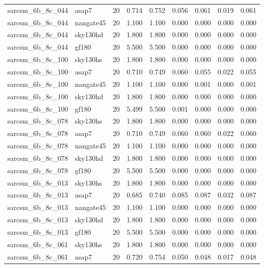 \begin{tabular}{llrrrrrrr}
sarcsm\_6b\_8c\_044 & asap7 & 20 & 0.714 & 0.752 & 0.056 & 0.061 & 0.019 & 0.061 \\
sarcsm\_6b\_8c\_044 & nangate45 & 20 & 1.100 & 1.100 & 0.000 & 0.000 & 0.000 & 0.000 \\
sarcsm\_6b\_8c\_044 & sky130hd & 20 & 1.800 & 1.800 & 0.000 & 0.000 & 0.000 & 0.000 \\
sarcsm\_6b\_8c\_044 & gf180 & 20 & 5.500 & 5.500 & 0.000 & 0.000 & 0.000 & 0.000 \\
sarcsm\_6b\_8c\_100 & sky130hs & 20 & 1.800 & 1.800 & 0.000 & 0.000 & 0.000 & 0.000 \\
sarcsm\_6b\_8c\_100 & asap7 & 20 & 0.710 & 0.749 & 0.060 & 0.055 & 0.022 & 0.055 \\
sarcsm\_6b\_8c\_100 & nangate45 & 20 & 1.100 & 1.100 & 0.000 & 0.001 & 0.000 & 0.001 \\
sarcsm\_6b\_8c\_100 & sky130hd & 20 & 1.800 & 1.800 & 0.000 & 0.000 & 0.000 & 0.000 \\
sarcsm\_6b\_8c\_100 & gf180 & 20 & 5.499 & 5.500 & 0.001 & 0.000 & 0.000 & 0.000 \\
sarcsm\_6b\_8c\_078 & sky130hs & 20 & 1.800 & 1.800 & 0.000 & 0.000 & 0.000 & 0.000 \\
sarcsm\_6b\_8c\_078 & asap7 & 20 & 0.710 & 0.749 & 0.060 & 0.060 & 0.022 & 0.060 \\
sarcsm\_6b\_8c\_078 & nangate45 & 20 & 1.100 & 1.100 & 0.000 & 0.000 & 0.000 & 0.000 \\
sarcsm\_6b\_8c\_078 & sky130hd & 20 & 1.800 & 1.800 & 0.000 & 0.000 & 0.000 & 0.000 \\
sarcsm\_6b\_8c\_078 & gf180 & 20 & 5.500 & 5.500 & 0.000 & 0.000 & 0.000 & 0.000 \\
sarcsm\_6b\_8c\_013 & sky130hs & 20 & 1.800 & 1.800 & 0.000 & 0.000 & 0.000 & 0.000 \\
sarcsm\_6b\_8c\_013 & asap7 & 20 & 0.685 & 0.740 & 0.085 & 0.087 & 0.032 & 0.087 \\
sarcsm\_6b\_8c\_013 & nangate45 & 20 & 1.100 & 1.100 & 0.000 & 0.000 & 0.000 & 0.000 \\
sarcsm\_6b\_8c\_013 & sky130hd & 20 & 1.800 & 1.800 & 0.000 & 0.000 & 0.000 & 0.000 \\
sarcsm\_6b\_8c\_013 & gf180 & 20 & 5.500 & 5.500 & 0.000 & 0.000 & 0.000 & 0.000 \\
sarcsm\_6b\_8c\_061 & sky130hs & 20 & 1.800 & 1.800 & 0.000 & 0.000 & 0.000 & 0.000 \\
sarcsm\_6b\_8c\_061 & asap7 & 20 & 0.720 & 0.754 & 0.050 & 0.048 & 0.017 & 0.048 \\

\end{tabular}
